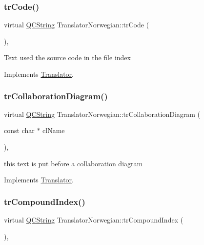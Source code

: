 \subsubsection{\texorpdfstring{trCode()}{trCode()}}
{\footnotesize\ttfamily virtual \mbox{\hyperlink{class_q_c_string}{Q\+C\+String}} Translator\+Norwegian\+::tr\+Code (\begin{DoxyParamCaption}{ }\end{DoxyParamCaption})\hspace{0.3cm}{\ttfamily [inline]}, {\ttfamily [virtual]}}

Text used the source code in the file index 

Implements \mbox{\hyperlink{class_translator}{Translator}}.

\mbox{\label{class_translator_norwegian_ac40494d5e82232929951ef28b9c20aa5}} 
\subsubsection{\texorpdfstring{trCollaborationDiagram()}{trCollaborationDiagram()}}
{\footnotesize\ttfamily virtual \mbox{\hyperlink{class_q_c_string}{Q\+C\+String}} Translator\+Norwegian\+::tr\+Collaboration\+Diagram (\begin{DoxyParamCaption}\item[{const char $\ast$}]{cl\+Name }\end{DoxyParamCaption})\hspace{0.3cm}{\ttfamily [inline]}, {\ttfamily [virtual]}}

this text is put before a collaboration diagram 

Implements \mbox{\hyperlink{class_translator}{Translator}}.

\mbox{\label{class_translator_norwegian_a6d566b4eae7efeff34766a62523ae7cc}} 
\subsubsection{\texorpdfstring{trCompoundIndex()}{trCompoundIndex()}}
{\footnotesize\ttfamily virtual \mbox{\hyperlink{class_q_c_string}{Q\+C\+String}} Translator\+Norwegian\+::tr\+Compound\+Index (\begin{DoxyParamCaption}{ }\end{DoxyParamCaption})\hspace{0.3cm}{\ttfamily [inline]}, {\ttfamily [virtual]}}

